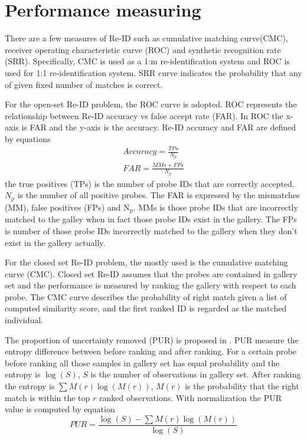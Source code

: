 \section{Performance measuring}
There are a few measures of Re-ID such as cumulative matching curve(CMC), receiver operating characteristic curve (ROC) and synthetic recognition rate (SRR). Specifically, CMC is used as a 1:m re-identification system and ROC is used for 1:1 re-identification system. SRR curve indicates the probability that any of given fixed number of matches is correct.

For the open-set Re-ID problem, the ROC \cite{PartbasedSTReid, MultiPersonREID} curve is adopted. ROC represents the relationship between Re-ID accuracy vs false accept rate (FAR). In ROC the x-axis is FAR and the y-axis is the accuracy. Re-ID accuracy and FAR are defined by equations
\begin{equation}
\begin{aligned}
Accuracy = \frac{TPs}{N_p}\\
FAR = \frac{MMs + FPs}{N_p}
\end{aligned}
\end{equation}
the true positives (TPs) is the number of probe IDs that are correctly accepted. $N_p$ is the number of all positive probes. The FAR is expressed by the mismatches (MM), false positives (FPs) and N$_\text{p}$. MMs is those probe IDs that are incorrectly matched to the galley when in fact those probe IDs exist in the gallery. The FPs is number of those probe IDs incorrectly matched to the gallery when they don't exist in the gallery actually. 

For the closed set Re-ID problem, the mostly used is the cumulative matching curve (CMC). Closed set Re-ID assumes that the probes are contained in gallery set and the performance is measured by ranking the gallery with respect to each probe. The CMC curve describes the probability of right match given a list of computed similarity score, and the first ranked ID is regarded as the matched individual.

The proportion of uncertainty removed (PUR) is proposed in \cite{LFDA}. PUR measure the entropy difference between before ranking and after ranking. For a certain probe before ranking all those samples in gallery set has equal probability and the entropy is $\log(S)$, $S$ is the number of observations in gallery set. After ranking the entropy is $\sum M(r)\log(M(r))$, $M(r)$ is the probability that the right match is within the top $r$ ranked observations. With normalization the PUR value is computed by equation
\begin{equation}
PUR = \frac{\log(S)-\sum M(r)\log(M(r))}{\log(S)}
\end{equation}

